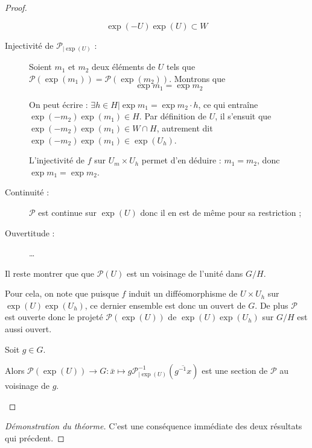 \begin{proof}
\begin{description}
\[\exp(-U)\exp(U)\subset W\]
\begin{description}
\item[Injectivit\'e de $\mathcal{P}_{|\exp(U)}$ :] %
%
Soient $m_1$ et $m_2$ deux \'el\'ements de $U$ tels que $\mathcal{P}(\exp(m_1))=\mathcal{P}(\exp(m_2))$. %
Montrons que \[\exp m_1=\exp m_2\]

\par
On peut \'ecrire : $\exists h\in H | \exp m_1=\exp m_2 \cdot h$, ce qui entra\^ine $\exp(-m_2)\exp(m_1)\in H$. %
Par d\'efinition de $U$, il s'ensuit que $\exp(-m_2)\exp(m_1)\in W\cap H$, autrement dit $\exp(-m_2)\exp(m_1)\in \exp(U_h)$.

\par
L'injectivit\'e de $f$ sur $U_m\times U_h$ permet d'en d\'eduire : $m_1=m_2$, donc $\exp m_1=\exp m_2$.
\item[Continuit\'e :] $\mathcal{P}$ est continue sur $\exp (U)$ donc il en est de m\^eme pour sa restriction ;
\item[Ouvertitude :] \dots
\end{description}

\par
Il reste  montrer que que $\mathcal{P}(U)$ est un voisinage de l'unit\'e dans $G/H$.

\par
Pour cela, on note que puisque $f$ induit un diff\'eomorphisme de $U\times U_h$ sur $\exp (U)\exp(U_h)$, ce dernier ensemble est donc un ouvert de $G$. %
De plus $\mathcal{P}$ est ouverte donc le projet\'e $\mathcal{P}(\exp(U))$ de $\exp (U)\exp(U_h)$ sur $G/H$ est aussi ouvert.

\item[Section locale en un \'el\'ement $g$ quelconque de $G$ :] Soit $g\in G$.
%

\par
Alors $\mathcal{P}(\exp(U))\rightarrow G:\bar{x}\mapsto g\mathcal{P}_{|\exp(U)}^{-1}\left(\overline{g^{-1}x}\right)$ est une section de $\mathcal{P}$ au voisinage de $g$.
\end{description}
\end{proof}

\begin{proof}[D\'emonstration du th\'eorme]
C'est une cons\'equence imm\'ediate des deux r\'esultats qui pr\'ecdent.
\end{proof}

